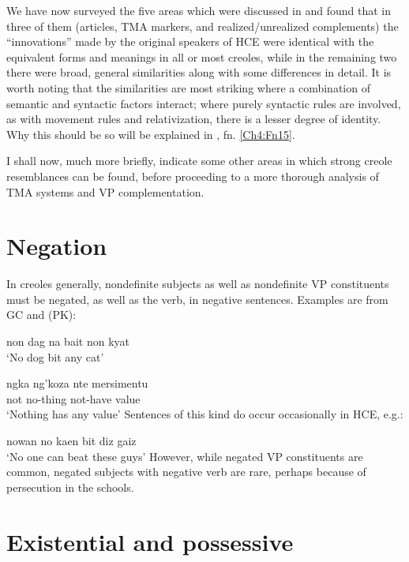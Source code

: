 We have now surveyed the five areas which were discussed in  and found that in three of them (articles, TMA markers, and realized/unrealized complements) the ``innovations'' made by the original speakers of HCE were identical with the equivalent forms and meanings in all or most creoles, while in the remaining two there were broad, general similarities along with some differences in detail. It is worth noting that the similarities are most striking where a combi\-nation of semantic and syntactic factors interact; where purely syntactic rules are involved, as with movement rules and relativization, there is a lesser degree of identity. Why this should be so will be explained in , fn. \ref{Ch4:Fn15}.

I shall now, much more briefly, indicate some other areas in which strong creole resemblances can be found, before proceeding to a more thorough analysis of TMA systems and VP complementation.

\section{Negation}

In creoles generally, nondefinite subjects as well as nondefinite VP constituents must be negated, as well as the verb, in negative sentences. Examples are from GC and  (PK):


\ea\label{ex:2:52}
 non dag na bait non kyat\\
\glt `No dog bit any cat'
\z

\ea\label{ex:2:53}
\gll ngka ng'koza nte mersimentu\\
 not no-thing not-have value \\
\glt `Nothing has any value'
\z
Sentences of this kind do occur occasionally in HCE, e.g.:

\ea\label{ex:2:54}
 nowan no kaen bit diz gaiz \\
\glt `No one can beat these guys'
\z
However, while negated VP constituents are common, negated subjects with negative verb are rare, perhaps because of persecution in the schools.

\section{Existential and possessive}

